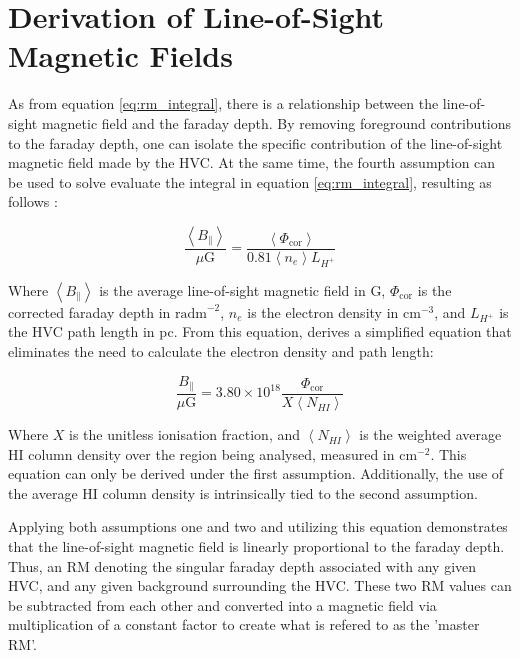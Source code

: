 \section{Derivation of Line-of-Sight Magnetic Fields}
\label{sec:los_dev}

As from equation \ref{eq:rm_integral}, there is a relationship between the line-of-sight magnetic field and the faraday depth. By removing foreground contributions to the faraday depth, one can isolate the specific contribution of the line-of-sight magnetic field made by the HVC. At the same time, the fourth assumption can be used to solve evaluate the integral in equation \ref{eq:rm_integral}, resulting as follows \citep{ID26}:


\begin{equation}
    \frac{\left<B_{\parallel}\right>}{\mu\mathrm{G}}=\frac{\left<\Phi_{\mathrm{cor}}\right>}{0.81\left<n_e\right>L_{H^+}}
\label{eq:B_intermediate}
\end{equation}


Where $\left<B_{\parallel}\right>$ is the average line-of-sight magnetic field in \textmu G, $\Phi_{\mathrm{cor}}$ is the corrected faraday depth in $\mathrm{rad m}^{-2}$, $n_e$ is the electron density in $\mathrm{cm}^{-3}$, and $L_{H^+}$ is the HVC path length in pc. From this equation, \cite{ID27} derives a simplified equation that eliminates the need to calculate the electron density and path length:


\begin{equation}
    \frac{B_{\parallel}}{\mu\mathrm{G}}=3.80\times10^{18}\frac{\Phi_{\mathrm{cor}}}{X\left<N_{HI}\right>}
\label{eq:the_equation}
\end{equation}


Where $X$ is the unitless ionisation fraction, and $\left<N_{HI}\right>$ is the weighted average HI column density over the region being analysed, measured in $\mathrm{cm}^{-2}$. This equation can only be derived under the first assumption. Additionally, the use of the average HI column density is intrinsically tied to the second assumption.


Applying both assumptions one and two and utilizing this equation demonstrates that the line-of-sight magnetic field is linearly proportional to the faraday depth. Thus, an RM denoting the singular faraday depth associated with any given HVC, and any given background surrounding the HVC. These two RM values can be subtracted from each other and converted into a magnetic field via multiplication of a constant factor to create what is refered to as the 'master RM'.


